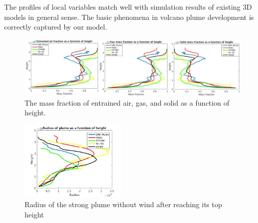 \documentclass[journal abbreviation, manuscript]{copernicus}
\begin{document}
The profiles of local variables match well with simulation results of existing 3D models in general sense. The basic phenomena in volcano plume development is correctly captured by our model.

\begin{figure}
\includegraphics[width=15cm]{msfrac}
\caption{The mass fraction of entrained air, gas, and solid as a function of height.}
\label{fig:strong_plume_mass_fraction}
\end{figure}
%

\begin{figure}
\center
\includegraphics[width=5cm]{radius_strong}
\caption{Radius of the strong plume without wind after reaching its top height}
\label{fig:strong_local_radius}
\end{figure}
\end{document}
